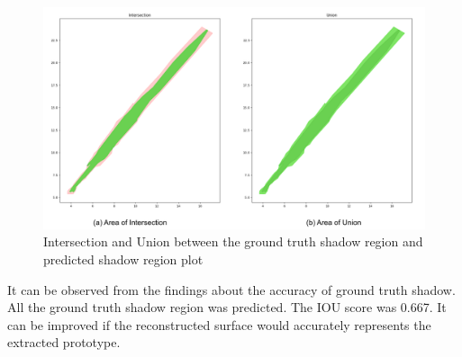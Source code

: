 \begin{figure}[htbp]
    \centering
    \includegraphics[width=1\linewidth]{97_graphics//evaluation/shadow_iou.pdf}
    \caption{Intersection and Union between the ground truth shadow region and predicted shadow region plot}
    \label{fig:evaluation-shadow_iou}
\end{figure}

It can be observed from the findings about the accuracy of ground truth shadow. All the ground truth shadow region was predicted. The IOU score was 0.667. It can be improved if the reconstructed surface would accurately represents the extracted prototype. 

